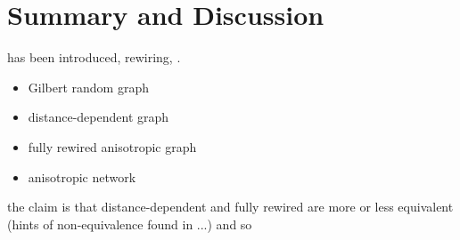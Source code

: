 

\section{Summary and Discussion}

has been introduced, rewiring, .


\begin{itemize}
\item Gilbert random graph
\item distance-dependent graph
\item fully rewired anisotropic graph
\item anisotropic network
\end{itemize}

the claim is that distance-dependent and fully rewired are more or
less equivalent (hints of non-equivalence found in ...) and so

